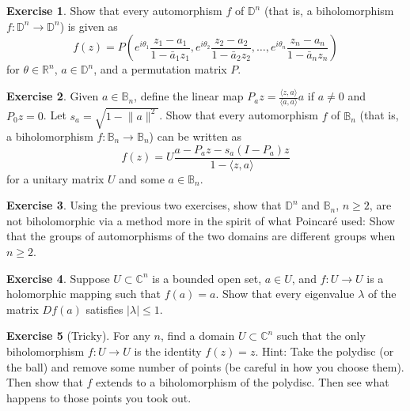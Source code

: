 \documentclass[12pt,openany]{book}
\newcommand{\linnprod}[2]{\langle #1 , #2 \rangle}
\newcommand{\sabs}[1]{\lvert {#1} \rvert}
\newcommand{\snorm}[1]{\lVert {#1} \rVert}
\newcommand{\C}{{\mathbb{C}}}
\newcommand{\R}{{\mathbb{R}}}
\newcommand{\D}{{\mathbb{D}}}
\newcommand{\bB}{{\mathbb{B}}}
\theoremstyle{plain}
\theoremstyle{remark}
\theoremstyle{definition}
\newenvironment{exbox}{%
    \def\FrameCommand{\vrule width 1pt \relax\hspace{10pt}}%
    \MakeFramed{\advance\hsize-\width\FrameRestore}%
}{%
    \endMakeFramed
}
\theoremstyle{exercise}
\newtheorem{exercise}{Exercise}[section]
\theoremstyle{example}
\begin{document}
\begin{exbox}
\begin{exercise} \label{exercise:autofpolydisc}
Show that every automorphism $f$ of $\D^n$ (that is, a biholomorphism $f \colon \D^n \to \D^n$)
is given as
\begin{equation*}
f(z) = P \left(
e^{i\theta_1} \frac{z_1-a_1}{1-\bar{a}_1z_1} ,
e^{i\theta_2} \frac{z_2-a_2}{1-\bar{a}_2z_2} , \ldots,
e^{i\theta_n} \frac{z_n-a_n}{1-\bar{a}_nz_n} \right)
\end{equation*}
for $\theta \in \R^n$, $a \in \D^n$, and
a permutation matrix $P$.
\end{exercise}

\begin{exercise}
Given $a \in \bB_n$, define the linear map $P_a z =
\frac{\linnprod{z}{a}}{\linnprod{a}{a}}a$ if $a \not= 0$ and $P_0z = 0$.
Let $s_a = \sqrt{1-\snorm{a}^2}$.  Show that every automorphism $f$ of
$\bB_n$ (that is, a biholomorphism $f \colon \bB_n \to \bB_n$)
can be written as
\begin{equation*}
f(z) = U \frac{a-P_az-s_a(I-P_a)z}{1-\linnprod{z}{a}}
\end{equation*}
for a unitary matrix $U$ and some $a \in \bB_n$.
\end{exercise}

\begin{exercise}
Using the previous two exercises, show that $\D^n$ and $\bB_n$, $n \geq 2$,
are not biholomorphic via a method more in the spirit of what Poincar\'e
used: Show that the groups of automorphisms of the two domains are
different groups when $n \geq 2$.
\end{exercise}

\begin{exercise} \label{exercise:boundedeigen}
Suppose $U \subset \C^n$ is a bounded open set, $a \in U$, and $f \colon U \to U$ is a
holomorphic mapping such that $f(a) = a$.  Show that every eigenvalue
$\lambda$ of the matrix $Df(a)$ satisfies $\sabs{\lambda} \leq 1$.
\end{exercise}

\begin{exercise}[Tricky]
For any $n$, find a domain $U \subset \C^n$ such that the only biholomorphism $f \colon U
\to U$ is the identity $f(z) = z$.  Hint: Take the polydisc (or the ball)
and remove some number of points (be careful in how you choose them).  Then
show that $f$ extends to a biholomorphism of the polydisc.  Then see what
happens to those points you took out.
\end{exercise}


\end{exbox}
\end{document}
